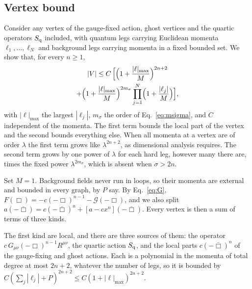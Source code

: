 \documentclass[a4paper,11pt]{article}
\begin{document}
\subsection{Vertex bound}
\label{sec:vertex}

Consider any vertex of the gauge-fixed action, ghost vertices and the quartic operators $S_{\rm q}$ included, with quantum legs carrying Euclidean momenta $\ell_1,\dots,\ell_N$ and background legs carrying momenta in a fixed bounded set. We show that, for every $n\ge1$,
\begin{multline}
\label{eq:vertexbound}
|V|\le C\,\Bigl[\Bigl(1+\frac{|\ell|_{\max}}{M}\Bigr)^{2n+2}\\
+\Bigl(1+\frac{|\ell|_{\max}}{M}\Bigr)^{2m_\sigma}\prod_{j=1}^N\Bigl(1+\frac{|\ell_j|}{M}\Bigr)\Bigr],
\end{multline}
with $|\ell|_{\max}$ the largest $|\ell_j|$, $m_\sigma$ the order of Eq.~\eqref{eq:msigma}, and $C$ independent of the momenta. The first term bounds the local part of the vertex and the second bounds everything else. When all momenta at a vertex are of order $\lambda$ the first term grows like $\lambda^{2n+2}$, as dimensional analysis requires. The second term grows by one power of $\lambda$ for each hard leg, however many there are, times the fixed power $\lambda^{2m_\sigma}$, which is absent when $\sigma>2n$.

Set $M=1$. Background fields never run in loops, so their momenta are external and bounded in every graph, by $P$ say. By Eq.~\eqref{eq:G}, $F(\Box)=-c(-\Box)^{n-1}-\mathcal G(-\Box)$, and we also split $a(-\bar\Box)=c(-\bar\Box)^n+[a-cx^n](-\bar\Box)$. Every vertex is then a sum of terms of three kinds.

The first kind are local, and there are three sources of them: the operator $c\,G_{\mu\nu}(-\Box)^{n-1}R^{\mu\nu}$, the quartic action $S_{\rm q}$, and the local parts $c(-\bar\Box)^n$ of the gauge-fixing and ghost actions. Each is a polynomial in the momenta of total degree at most $2n+2$, whatever the number of legs, so it is bounded by $C(\sum_j|\ell_j|+P)^{2n+2}\le C(1+|\ell|_{\max})^{2n+2}$.
\end{document}
